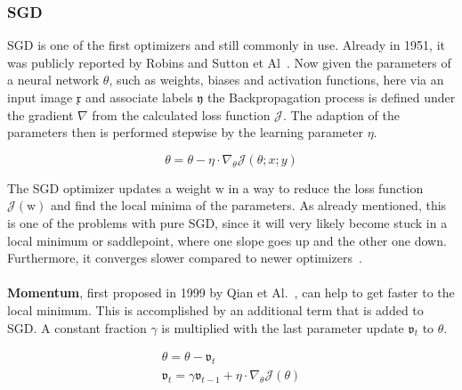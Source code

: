 %
\subsubsection{\gls{SGD}}
\gls{SGD} is one of the first optimizers and still commonly in use.
Already in 1951, it was publicly reported by Robins and Sutton et Al~\cite{sgd}.
Now given the parameters of a neural network $\theta$, such as weights, biases and activation functions, here via an input image
$\mathfrak{x}$ and associate labels $\mathfrak{y}$ the Backpropagation process is defined under the gradient $\nabla$
from the calculated loss function $\mathcal{J}$.
The adaption of the parameters then is performed stepwise by the learning parameter $\eta$.


\begin{equation}
    \theta = \theta - \eta\cdot\nabla_\theta\mathcal{J}(\theta;x;y)
    \label{eqn:sgd}
\end{equation}

The \gls{SGD} optimizer updates a weight $\mathrm{w}$ in a way to reduce the loss function $\mathcal{J}(\mathrm{w})$ and find
the local minima of the parameters.
As already mentioned, this is one of the problems with pure \gls{SGD}, since it will very likely become stuck in a local minimum or
saddlepoint, where one slope goes up and the other one down.
Furthermore, it converges slower compared to newer optimizers~\cite{optimizersoverview, optimizersexplained}.
\\\mbox{}\\
\textbf{Momentum}, first proposed in 1999 by Qian et Al.~\cite{momentum}, can help to get faster to the local minimum.
This is accomplished by an additional term that is added to \gls{SGD}.
A constant fraction $\gamma$ is multiplied with the last parameter update $\mathfrak{v}_t$ to $\theta$.

\begin{align}
    \theta = \theta - \mathfrak{v}_t \label{eqn:momentum:1}\\
    \mathfrak{v}_t = \gamma\mathfrak{v}_{t-1} + \eta\cdot\nabla_\theta\mathcal{J}(\theta) \label{eqn:momentum:2}
\end{align}

